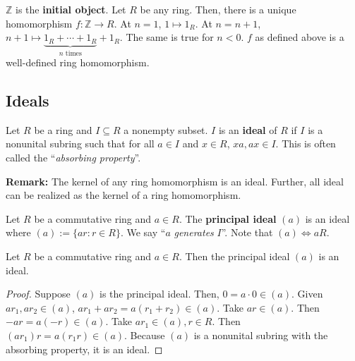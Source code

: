 \documentclass [12pt] {article}
\newcommand{\Z}{\mathbb{Z}}
\newenvironment{definition}[1]{\begin{tcolorbox}[title={Definition: #1},colback=blue!5!white,colframe=black!75!blue]}{\end{tcolorbox}}
\newenvironment{theorem}[1]{\begin{tcolorbox}[title={Theorem #1},colback=green!5!white,colframe=black!75!green]}{\end{tcolorbox}}
\renewcommand{\it}[1]{\textit{{#1}}}
\renewcommand{\bf}[1]{\textbf{{#1}}}
\begin{document}
\begin{definition}{Initial Object}
    $\Z$ is the \bf{initial object}. Let $R$ be any ring. Then, there is a unique homomorphism 
    $f : \Z \to R$. At $n = 1$, $1 \mapsto 1_R$. At $n = n + 1$, 
    $n + 1 \mapsto \underbrace{1_R + \cdots + 1_R}_{n \text{ times}} + 1_R$. The same is true for 
    $n < 0$. $f$ as defined above is a well-defined ring homomorphism.
\end{definition}

\subsection{Ideals}
\begin{definition}{Ideal}
    Let $R$ be a ring and $I \subseteq R$ a nonempty subset. $I$ is an \bf{ideal} of $R$ if $I$ is
    a nonunital subring such that for all $a \in I$ and $x \in R$, $xa, ax \in I$. This is often 
    called the ``\it{absorbing property}''.
\end{definition}
\bf{Remark:} The kernel of any ring homomorphism is an ideal. Further, all ideal can be realized as
the kernel of a ring homomorphism.

\begin{definition}{Principal Ideal}
    Let $R$ be a commutative ring and $a \in R$. The \bf{principal ideal} $(a)$ is an ideal where
    $(a) := \{ ar : r \in R \}$. We say ``$a$ \it{generates} $I$''. Note that $(a) \iff aR$.
\end{definition}

\begin{theorem}{}
    Let $R$ be a commutative ring and $a \in R$. Then the principal ideal $(a)$ is an ideal.
\end{theorem}
\begin{proof}
    Suppose $(a)$ is the principal ideal. Then, $0 = a \cdot 0 \in (a)$. Given $ar_1, ar_2 \in (a)$, 
    $ar_1 + ar_2 = a(r_1 + r_2) \in (a)$. Take $ar \in (a)$. Then $-ar = a(-r) \in (a)$. Take
    $ar_1 \in (a), r \in R$. Then $(ar_1) r = a(r_1 r) \in (a)$. Because $(a)$ is a nonunital subring
    with the absorbing property, it is an ideal.
\end{proof}
\end{document}
